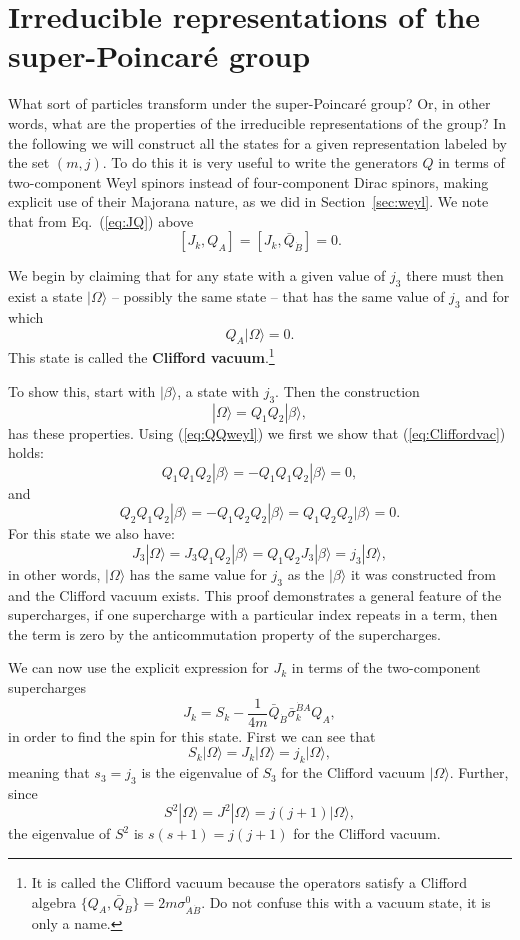 \documentclass[notes.tex]{subfiles}
\begin{document}
\section{Irreducible representations of the super-Poincaré group}
\label{sec:superalgebrarep}
What sort of particles transform under the super-Poincaré group? Or, in other words, what are the properties of the irreducible representations of the group? 
In the following we will construct all the states for a given representation labeled by the set $(m,j)$. To do this it is very useful to write the generators $Q$ in terms of two-component Weyl spinors instead of four-component Dirac spinors, making explicit use of their Majorana nature, as we did in Section~\ref{sec:weyl}. We note that from Eq.~(\ref{eq:JQ}) above 
\[[J_k, Q_A] = [J_k, \bar{Q}_{\dot{B}}] = 0.\]

We begin by claiming that for any state with a given value of $j_3$ there must then exist a state $|\Omega\rangle$ -- possibly the same state -- that has the same value of $j_3$ and for which
\begin{equation}
Q_A|\Omega\rangle = 0.\label{eq:Cliffordvac}
\end{equation}
This state is called the {\bf Clifford vacuum}.\footnote{It is called the Clifford vacuum because the operators satisfy a Clifford algebra $\{Q_A, \bar{Q}_{\dot{B}}\} = 2m\sigma^0_{A\dot{B}}$. Do not confuse this with a vacuum state, it is only a name.} 

To show this, start with $|\beta\rangle$, a state with $j_3$. Then the construction
\[ |\Omega\rangle=Q_1Q_2|\beta\rangle,\]
has these properties. Using (\ref{eq:QQweyl}) we first we show that (\ref{eq:Cliffordvac}) holds:
\[Q_1Q_1Q_2|\beta\rangle = -Q_1Q_1Q_2|\beta \rangle = 0,\]
and
\[Q_2Q_1Q_2|\beta\rangle = -Q_1Q_2Q_2|\beta\rangle = Q_1Q_2Q_2|\beta\rangle= 0.\]
For this state we also  have:
\begin{equation*}
J_3 |\Omega\rangle = J_3Q_1Q_2|\beta\rangle =Q_1Q_2J_3|\beta\rangle = j_3|\Omega\rangle,
\end{equation*}
in other words, $|\Omega\rangle$ has the same value for $j_3$ as the $|\beta\rangle$ it was constructed from and  the Clifford vacuum exists. This proof demonstrates a general feature of the supercharges, if one supercharge with a particular index repeats in a term, then the term is zero by the anticommutation property of the supercharges.

We can now use the explicit expression  for $J_k$ in terms of the two-component supercharges
\begin{equation}
J_k = S_k - \frac{1}{4m}\bar{Q}_{\dot{B}}\bar{\sigma}_k^{\dot{B}A}Q_A,
\label{eq:Jk_twocomp}
\end{equation}
in order to find the spin for this state. First we can see that
\[S_k|\Omega\rangle = J_k|\Omega\rangle =j_k|\Omega\rangle,\]
meaning that $s_3 = j_3$ is the eigenvalue of $S_3$ for the Clifford vacuum $|\Omega\rangle$. Further, since 
\[S^2|\Omega\rangle = J^2|\Omega\rangle =j(j+1)|\Omega\rangle,\]
the eigenvalue of $S^2$ is $s(s+1)=j(j+1)$ for the Clifford vacuum.
\end{document}
